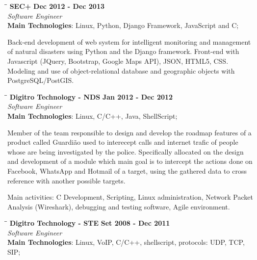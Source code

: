 \documentclass[margin]{res}
\begin{document}
\begin{resume}
   \begin{tabbing}
   \hspace{2.3in}\= \hspace{1.7in}\= \kill %
    \textbf{SEC+}    \>\>\textbf{Dec 2012 - Dec 2013}\\
    \textit{Software Engineer}\\        
    \textbf{Main Technologies}: Linux, Python, Django Framework, JavaScript and C;
   \end{tabbing}\vspace{-20pt}      %
    \vspace{2mm}
     Back-end development of web system for intelligent monitoring and management of natural disasters
     using Python and the Django framework. Front-end with Javascript (JQuery, Bootstrap, Google Maps API),
     JSON, HTML5, CSS. Modeling and use of object-relational database and geographic objects with
     PostgreSQL/PostGIS.

   \begin{tabbing}
   \hspace{2.3in}\= \hspace{1.7in}\= \kill %
    \textbf{Digitro Technology - NDS}    \>\>\textbf{Jan 2012 - Dec 2012}\\
    \textit{Software Engineer}\\   
    \textbf{Main Technologies}: Linux, C/C++, Java, ShellScript;
   \end{tabbing}\vspace{-20pt}      %
    \vspace{2mm}
    Member of the team responsible to design and develop the roadmap features of a product called
    Guardião used to interecept calls and internet trafic of people whose are being investigated by the police. 
    Specifically allocated on the design and development of a module which main goal is to intercept the actions 
    done on Facebook, WhatsApp and Hotmail of a target, using the gathered data to cross reference with another
    possible targets.

    Main activities: C Development, Scripting, Linux administration, Network Packet Analysis (Wireshark), debugging 
    and testing software, Agile environment.
   
   \vspace{2mm}
   \begin{tabbing}
   \hspace{2.3in}\= \hspace{1.5in}\= \kill %
    \textbf{Digitro Technology - STE}    \>\>\textbf{Set 2008 - Dec 2011}\\
    \textit{Software Engineer}\\   
    \textbf{Main Technologies}: Linux, VoIP, C/C++, shellscript, protocols: UDP, TCP, SIP;
   \end{tabbing}\vspace{-20pt}      %
    \vspace{2mm}
    

\end{resume}
\end{document}
